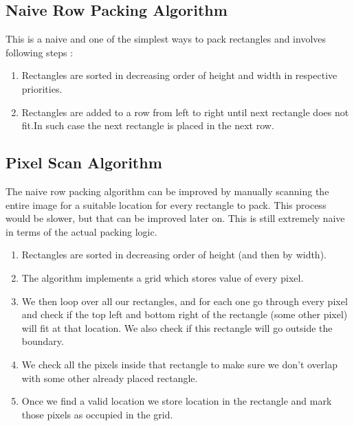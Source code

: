 \documentclass[12pt, a4paper,openany]{article}
\begin{document}
\subsection{Naive Row Packing Algorithm}
\begin{flushleft}
This is a naive and one of the simplest ways to pack rectangles and involves following steps :
\begin{enumerate}
    \item Rectangles are sorted in decreasing order of height and width in respective priorities.
    \item Rectangles are added to a row from left to right until next rectangle does not fit.In such case the next rectangle is placed in the next row.
\end{enumerate}
\end{flushleft}


\subsection{Pixel Scan Algorithm}
\begin{flushleft}
The naive row packing algorithm can be improved by manually scanning the entire image for a suitable location for every rectangle to pack. This process would be slower, but that can be improved later on. This is still extremely naive in terms of the actual packing logic.
\begin{enumerate}
    \item Rectangles are sorted in decreasing order of height (and then by width).
    \item The algorithm implements a grid which stores value of every pixel.
    \item We then loop over all our rectangles, and for each one go through every pixel and check if the top left and bottom right of the rectangle (some other pixel) will fit at that location. We also check if this rectangle will go outside the boundary.
    \item  We check all the pixels inside that rectangle to make sure we don’t overlap with some other already placed rectangle.
    \item Once we find a valid location we store location in the rectangle and mark those pixels as occupied in the grid.
    \end{enumerate}
\end{flushleft}
\end{document}
